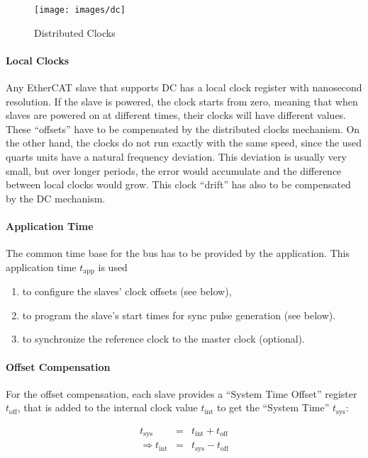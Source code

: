 \documentclass[a4paper,12pt,BCOR6mm,bibtotoc,idxtotoc]{scrbook}
\begin{document}
\begin{figure}[htbp]
  \centering
  \texttt{[image: images/dc]}
  \caption{Distributed Clocks}
  \label{fig:dc}
\end{figure}

\paragraph{Local Clocks} Any EtherCAT slave that supports DC has a local clock
register with nanosecond resolution. If the slave is powered, the clock starts
from zero, meaning that when slaves are powered on at different times, their
clocks will have different values. These ``offsets'' have to be compensated by
the distributed clocks mechanism. On the other hand, the clocks do not run
exactly with the same speed, since the used quarts units have a natural
frequency deviation. This deviation is usually very small, but over longer
periods, the error would accumulate and the difference between local clocks
would grow. This clock ``drift'' has also to be compensated by the DC
mechanism.

\paragraph{Application Time} The common time base for the bus has to be
provided by the application. This application time $t_\text{app}$ is used

\begin{enumerate}
\item to configure the slaves' clock offsets (see below),
\item to program the slave's start times for sync pulse generation (see
below).
\item to synchronize the reference clock to the master clock (optional).
\end{enumerate}

\paragraph{Offset Compensation} For the offset compensation, each slave
provides a ``System Time Offset'' register $t_\text{off}$, that is added to
the internal clock value $t_\text{int}$ to get the ``System Time''
$t_\text{sys}$:

\begin{eqnarray}
t_\text{sys} & = & t_\text{int} + t_\text{off} \\
\Rightarrow t_\text{int} & = & t_\text{sys} - t_\text{off} \nonumber
\end{eqnarray}
\end{document}
